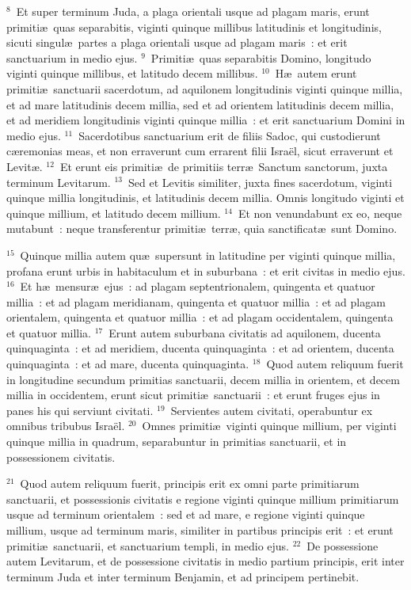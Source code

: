 ${}^{8}$~Et super terminum Juda, a plaga orientali usque ad plagam maris, erunt primiti\ae\ quas separabitis, viginti quinque millibus latitudinis et longitudinis, sicuti singul\ae\ partes a plaga orientali usque ad plagam maris~: et erit sanctuarium in medio ejus.
${}^{9}$~Primiti\ae\ quas separabitis Domino, longitudo viginti quinque millibus, et latitudo decem millibus.
${}^{10}$~H\ae\ autem erunt primiti\ae\ sanctuarii sacerdotum, ad aquilonem longitudinis viginti quinque millia, et ad mare latitudinis decem millia, sed et ad orientem latitudinis decem millia, et ad meridiem longitudinis viginti quinque millia~: et erit sanctuarium Domini in medio ejus.
${}^{11}$~Sacerdotibus sanctuarium erit de filiis Sadoc, qui custodierunt c\ae remonias meas, et non erraverunt cum errarent filii Isra\"el, sicut erraverunt et Levit\ae .
${}^{12}$~Et erunt eis primiti\ae\ de primitiis terr\ae\ Sanctum sanctorum, juxta terminum Levitarum.
${}^{13}$~Sed et Levitis similiter, juxta fines sacerdotum, viginti quinque millia longitudinis, et latitudinis decem millia. Omnis longitudo viginti et quinque millium, et latitudo decem millium.
${}^{14}$~Et non venundabunt ex eo, neque mutabunt~: neque transferentur primiti\ae\ terr\ae , quia sanctificat\ae\ sunt Domino.


${}^{15}$~Quinque millia autem qu\ae\ supersunt in latitudine per viginti quinque millia, profana erunt urbis in habitaculum et in suburbana~: et erit civitas in medio ejus.
${}^{16}$~Et h\ae\ mensur\ae\ ejus~: ad plagam septentrionalem, quingenta et quatuor millia~: et ad plagam meridianam, quingenta et quatuor millia~: et ad plagam orientalem, quingenta et quatuor millia~: et ad plagam occidentalem, quingenta et quatuor millia.
${}^{17}$~Erunt autem suburbana civitatis ad aquilonem, ducenta quinquaginta~: et ad meridiem, ducenta quinquaginta~: et ad orientem, ducenta quinquaginta~: et ad mare, ducenta quinquaginta.
${}^{18}$~Quod autem reliquum fuerit in longitudine secundum primitias sanctuarii, decem millia in orientem, et decem millia in occidentem, erunt sicut primiti\ae\ sanctuarii~: et erunt fruges ejus in panes his qui serviunt civitati.
${}^{19}$~Servientes autem civitati, operabuntur ex omnibus tribubus Isra\"el.
${}^{20}$~Omnes primiti\ae\ viginti quinque millium, per viginti quinque millia in quadrum, separabuntur in primitias sanctuarii, et in possessionem civitatis.


${}^{21}$~Quod autem reliquum fuerit, principis erit ex omni parte primitiarum sanctuarii, et possessionis civitatis e regione viginti quinque millium primitiarum usque ad terminum orientalem~: sed et ad mare, e regione viginti quinque millium, usque ad terminum maris, similiter in partibus principis erit~: et erunt primiti\ae\ sanctuarii, et sanctuarium templi, in medio ejus.
${}^{22}$~De possessione autem Levitarum, et de possessione civitatis in medio partium principis, erit inter terminum Juda et inter terminum Benjamin, et ad principem pertinebit.


